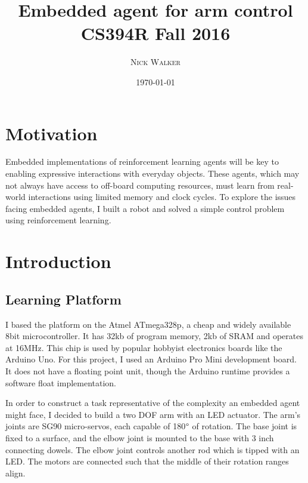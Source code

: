 \documentclass{article}
\title{Embedded agent for arm control \\ \large CS394R Fall 2016} %
\author{\textsc{Nick Walker}} %
\date{\today} %
\begin{document}
	
	\maketitle %
	
	
	
	\section{Motivation}
	
	Embedded implementations of reinforcement learning agents will be key to enabling expressive interactions with everyday objects. These agents, which may not always have access to off-board computing resources, must learn from real-world interactions using limited memory and clock cycles. To explore the issues facing embedded agents, I built a robot and solved a simple control problem using reinforcement learning.
	
	
	
	\section{Introduction}
	
	\subsection{Learning Platform}
	
	I based the platform on the Atmel ATmega328p, a cheap and widely available 8bit microcontroller. It has 32kb of program memory, 2kb of SRAM and operates at 16MHz. This chip is used by popular hobbyist electronics boards like the Arduino Uno. For this project, I used an Arduino Pro Mini development board. It does not have a floating point unit, though the Arduino runtime provides a software float implementation.
	
	In order to construct a task representative of the complexity an embedded agent might face, I decided to build a two DOF arm with an LED actuator. The arm's joints are SG90 micro-servos, each capable of 180$\degree$ of rotation. The base joint is fixed to a surface, and the elbow joint is mounted to the base with 3 inch connecting dowels. The elbow joint controls another rod which is tipped with an LED. The motors are connected such that the middle of their rotation ranges align.
	
\end{document}
